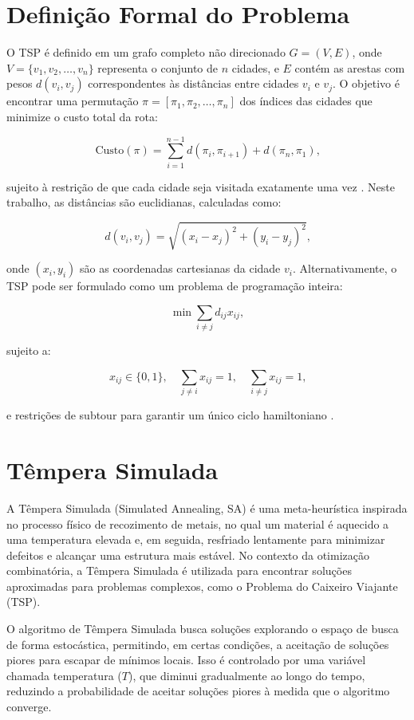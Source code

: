 \documentclass[11pt]{article}
\begin{document}
\section{Definição Formal do Problema}
O TSP é definido em um grafo completo não direcionado \(G = \left(V, E\right)\), onde \(V = \{v_1, v_2, \ldots, v_n\}\) representa o conjunto de \(n\) cidades, e \(E\) contém as arestas com pesos \(d\left(v_i, v_j\right)\) correspondentes às distâncias entre cidades \(v_i\) e \(v_j\). O objetivo é encontrar uma permutação \(\pi = \left[\pi_1, \pi_2, \ldots, \pi_n\right]\) dos índices das cidades que minimize o custo total da rota:

\[
    \text{Custo}(\pi) = \sum_{i=1}^{n-1} d\left(\pi_i, \pi_{i+1}\right) + d\left(\pi_n, \pi_1\right)\text{,}
\]

sujeito à restrição de que cada cidade seja visitada exatamente uma vez \cite{nilsson1982}. Neste trabalho, as distâncias são euclidianas, calculadas como:

\[
    d\left(v_i, v_j\right) = \sqrt{\left(x_i - x_j\right)^2 + \left(y_i - y_j\right)^2}\text{,}
\]

onde \(\left(x_i, y_i\right)\) são as coordenadas cartesianas da cidade \(v_i\). Alternativamente, o TSP pode ser formulado como um problema de programação inteira:

\[
    \min \sum_{i \neq j} d_{ij} x_{ij},
\]

sujeito a:

\[
    x_{ij} \in \{0,1\}, \quad \sum_{j \neq i} x_{ij} = 1, \quad \sum_{i \neq j} x_{ij} = 1\text{,}
\]

e restrições de subtour para garantir um único ciclo hamiltoniano \cite{orman2006}.

\section{Têmpera Simulada}

A Têmpera Simulada (Simulated Annealing, SA) é uma meta-heurística inspirada no processo físico de recozimento de metais, no qual um material é aquecido a uma temperatura elevada e, em seguida, resfriado lentamente para minimizar defeitos e alcançar uma estrutura mais estável. No contexto da otimização combinatória, a Têmpera Simulada é utilizada para encontrar soluções aproximadas para problemas complexos, como o Problema do Caixeiro Viajante (TSP).

O algoritmo de Têmpera Simulada busca soluções explorando o espaço de busca de forma estocástica, permitindo, em certas condições, a aceitação de soluções piores para escapar de mínimos locais. Isso é controlado por uma variável chamada temperatura (\(T\)), que diminui gradualmente ao longo do tempo, reduzindo a probabilidade de aceitar soluções piores à medida que o algoritmo converge.
\end{document}
